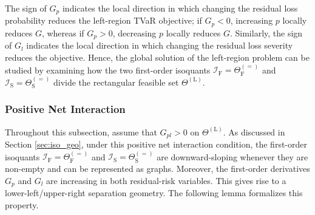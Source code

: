 \documentclass[a4paper,12pt]{article}
\begin{document}
The sign of $G_p$ indicates the local direction in which changing the residual loss probability reduces the left-region TVaR objective; if $G_p<0$, increasing $p$ locally reduces $G$, whereas if $G_p>0$, decreasing $p$ locally reduces $G$. Similarly, the sign of $G_l$ indicates the local direction in which changing the residual loss severity reduces the objective. Hence, the global solution of the left-region problem can be studied by examining how the two first-order isoquants $\mathcal{I}_{\text{F}}=\Theta_{\text{F}}^{\left(=\right)}$ and $\mathcal{I}_{\text{S}}=\Theta_{\text{S}}^{\left(=\right)}$ divide the rectangular feasible set $\Theta^{\left(\text{L}\right)}$.

\subsubsection{Positive Net Interaction}\label{sec:positive_net}

Throughout this subsection, assume that $G_{pl}>0$ on $\Theta^{\left(\text{L}\right)}$. As discussed in Section \ref{sec:iso_geo}, under this positive net interaction condition, the first-order isoquants $\mathcal{I}_{\text{F}}=\Theta_{\text{F}}^{\left(=\right)}$ and $\mathcal{I}_{\text{S}}=\Theta_{\text{S}}^{\left(=\right)}$ are downward-sloping whenever they are non-empty and can be represented as graphs.  Moreover, the first-order derivatives $G_p$ and $G_l$ are increasing in both residual-risk variables. This gives rise to a lower-left/upper-right separation geometry. The following lemma formalizes this property.
\end{document}
